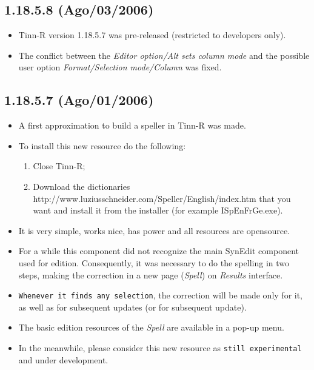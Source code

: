 \subsection{1.18.5.8 (Ago/03/2006)}

\begin{itemize}
  \item Tinn-R version 1.18.5.7 was pre-released (restricted to developers
    only).
  \item The conflict between the \textit{Editor option/Alt sets column mode}
    and the possible user option \textit{Format/Selection mode/Column}
    was fixed.
\end{itemize}


\subsection{1.18.5.7 (Ago/01/2006)}

\begin{itemize}
  \item A first approximation to build a speller in Tinn-R was made.
  \item To install this new resource do the following:
    \begin{enumerate}
      \item Close Tinn-R;
      \item Download the dictionaries\\
        {http://www.luziusschneider.com/Speller/English/index.htm}
        that you want and install it from the installer (for
        example ISpEnFrGe.exe).
    \end{enumerate}
  \item It is very simple, works nice, has power and all resources are
    opensource.
  \item For a while this component did not recognize the main SynEdit
    component used for edition. Consequently, it was necessary to do the spelling
    in two steps, making the correction in a new page (\textit{Spell})
    on \textit{Results} interface.
  \item \texttt{Whenever it finds any selection}, the correction will be
    made only for it, as well as for subsequent updates (or for subsequent update).
  \item The basic edition resources of the \textit{Spell} are available
    in a pop-up menu.
  \item In the meanwhile, please consider this new resource as \texttt{still
      experimental} and under development.
\end{itemize}


